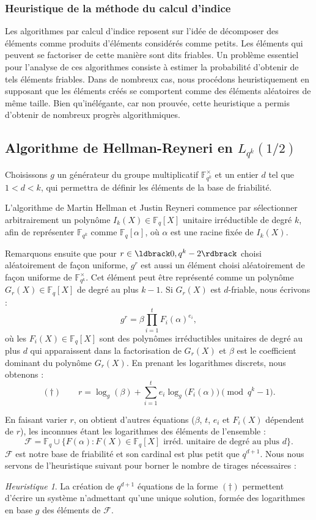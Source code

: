 \documentclass[a4paper, titlepage, 11pt]{article}
\theoremstyle{definition}
\theoremstyle{remark}
\newtheorem{heur}[theo]{Heuristique}
\def\gf #1{\mathbb{F}_{#1}}
\begin{document}
\subsubsection{Heuristique de la méthode du calcul d'indice}
Les algorithmes par calcul d'indice reposent sur l'idée de décomposer des éléments comme produits d'éléments considérés comme petits. Les éléments qui peuvent se factoriser de cette manière sont dits friables. Un problème essentiel pour l'analyse de ces algorithmes consiste à estimer la probabilité d'obtenir de tels éléments friables. Dans de nombreux cas, nous procédons heuristiquement en supposant que les éléments créés se comportent comme des éléments aléatoires de même taille. Bien qu'inélégante, car non prouvée, cette heuristique a permis d'obtenir de nombreux progrès algorithmiques.

\subsection{Algorithme de Hellman-Reyneri en $L_{q^k}(1/2)$}

Choisissons $g$ un générateur du groupe multiplicatif $\gf{q^k}^\times$ et un entier $d$ tel que $1 < d < k$, qui permettra de définir les éléments de la base de friabilité.

L'algorithme de Martin Hellman et Justin Reyneri \cite{hellman1982} commence par sélectionner arbitrairement un polynôme $I_k(X) \in \gf{q}[X]$ unitaire irréductible de degré $k$, afin de représenter $\gf{q^k}$ comme $\gf{q}[\alpha]$, où $\alpha$ est une racine fixée de $I_k(X)$.

Remarquons ensuite que pour $r \in \ldbrack 0, q^k - 2 \rdbrack$ choisi aléatoirement de façon uniforme, $g^r$ est aussi un élément choisi aléatoirement de façon uniforme de $\gf{q^k}^\times$. Cet élément peut être représenté comme un polynôme $G_r(X) \in \gf{q}[X]$ de degré au plus $k-1$. Si $G_r(X)$ est $d$-friable, nous écrivons :
$$g^r = \beta \prod_{i=1}^{t} F_i(\alpha)^{e_i},$$
où les $F_i(X)\in \gf{q}[X]$ sont des polynômes irréductibles unitaires de degré au plus $d$ qui apparaissent dans la factorisation de $G_r(X)$ et $\beta$ est le coefficient dominant du polynôme $G_r(X)$. En prenant les logarithmes discrets, nous obtenons :
$$(\dagger) \qquad r = \log_g(\beta) + \sum_{i=1}^t e_i\log_g\big(F_i(\alpha)\big) \pmod{q^k - 1}.$$

En faisant varier $r$, on obtient d'autres équations ($\beta$, $t$, $e_i$ et $F_i(X)$ dépendent de $r$), les inconnues étant les logarithmes des éléments de l'ensemble :
$$\mathcal{F} =  \gf{q} \cup \{F(\alpha) : F(X) \in \gf{q}[X] \text{ irréd. unitaire de degré au plus } d \}.$$
$\mathcal{F}$ est notre base de friabilité et son cardinal est plus petit que $q^{d+1}$. Nous nous servons de l'heuristique suivant pour borner le nombre de tirages nécessaires :
\begin{heur}
La création de $q^{d+1}$ équations de la forme $(\dagger)$ permettent d'écrire un système n'admettant qu'une unique solution, formée des logarithmes en base $g$ des éléments de $\mathcal{F}$.
\end{heur}
\end{document}
